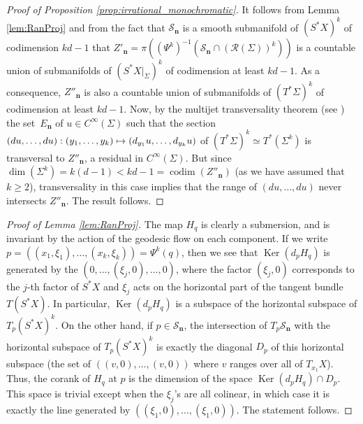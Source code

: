 \documentclass[JEP,XML,SOM,Unicode,published]{cedram}
\let\mathcal\mathscr
\newcommand\mto{\mathchoice{\longmapsto}{\mapsto}{\mapsto}{\mapsto}}
\DeclareMathOperator{\codim}{codim}
\DeclareMathOperator{\Ker}{Ker}
\theoremstyle{plain}
\theoremstyle{definition}
\def\calS{\mathcal{S}}
\begin{document}
\begin{proof}[Proof of Proposition \ref{prop:irrational_monochromatic}]
It follows from Lemma \ref{lem:RanProj} and from the fact that $\calS_{\boldsymbol{n}}$ is a smooth submanifold of $(S^*X)^k$ of codimension $kd-1$ that $Z'_{\boldsymbol{n}}= \pi \left((\Psi^k)^{-1}(\calS_{\boldsymbol{n}}\cap (\mathcal{R}(\Sigma))^k) \right)$ is a countable union of submanifolds of $(S^*X|_\Sigma)^k$ of codimension at least $kd-1$. As a consequence, $Z''_{\boldsymbol{n}}$ is also a countable union of submanifolds of $(T^*\Sigma)^k$ of codimension at least $kd-1$. Now, by the multijet transversality theorem (see \cite[Th.\,4.13, Chap.\,2]{GG}) the set~$E_{\boldsymbol{n}}$ of $u\in C^\infty(\Sigma)$ such that the section $(du,\dots,du):(y_1,\dots,y_k)\mto (d_{y_1}u,\dots,d_{y_k}u)$ of $(T^*\Sigma)^k\simeq T^*(\Sigma^k)$ is transversal to $Z''_{\boldsymbol{n}}$, a residual in $C^\infty(\Sigma)$. But since $\dim(\Sigma^k)=k(d-1)<kd-1=\codim(Z''_{\boldsymbol{n}})$ (as we have assumed that $k\geq 2$), transversality in this case implies that the range of $(du,\dots,du)$ never intersects $Z''_{\boldsymbol{n}}$.
The result follows.
\end{proof}

\begin{proof}[Proof of Lemma \ref{lem:RanProj}]
The map $H_q$ is clearly a submersion, and is invariant by the action of the geodesic flow on each component. If we write $p= ((x_1,\xi_1),\dots,(x_k,\xi_k)) = \Psi^k(q)$, then we see that
$\Ker(d_p H_q)$ is generated by the $(0,\dots,(\xi_j,0),\dots,0)$, where the factor $(\xi_j,0)$ corresponds to the $j$-th factor of $S^*X$ and $\xi_j$ acts on the horizontal part of the tangent bundle $T(S^*X)$. In particular, $\Ker(d_p H_q)$ is a subspace of the horizontal subspace of $T_p(S^*X)^k$. On the other hand, if $p\in\calS_{\boldsymbol{n}}$, the intersection of $T_p\calS_{\boldsymbol{n}}$ with the horizontal subspace of $T_p(S^*X)^k$ is exactly the diagonal $D_p$ of this horizontal subspace (\ie the set of $((v,0),\dots,(v,0))$ where $v$ ranges over all of $T_{x_1}X$). Thus, the corank of $H_q$ at $p$ is the dimension of the space $\Ker(d_p H_q)\cap D_p$. This space is trivial except when the $\xi_j$'s are all colinear, in which case it is exactly the line generated by $((\xi_1,0),\dots,(\xi_1,0))$. The statement follows.
\end{proof}
\end{document}
